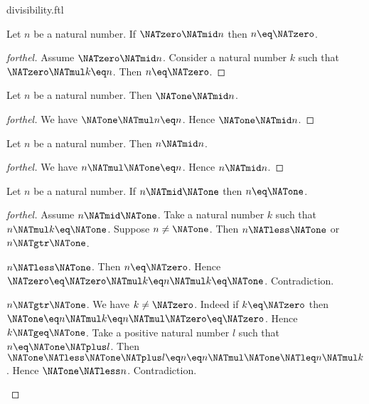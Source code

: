 \documentclass{stex}
\begin{document}
\begin{smodule}{divisibility.ftl}
\begin{proposition}[forthel,id=ARITHMETIC_07_8611150130315264]
  Let $n$ be a natural number.
  If $\NATzero \NATmid n$ then $n \eq \NATzero$.
\end{proposition}
\begin{proof}[forthel]
  Assume $\NATzero \NATmid n$.
  Consider a natural number $k$ such that $\NATzero \NATmul k \eq n$.
  Then $n \eq \NATzero$.
\end{proof}

\begin{proposition}[forthel,id=ARITHMETIC_07_1259086070939648]
  Let $n$ be a natural number.
  Then $\NATone \NATmid n$.
\end{proposition}
\begin{proof}[forthel]
  We have $\NATone \NATmul n \eq n$.
  Hence $\NATone \NATmid n$.
\end{proof}

\begin{proposition}[forthel,id=ARITHMETIC_07_3944887330275328]
  Let $n$ be a natural number.
  Then $n \NATmid n$.
\end{proposition}
\begin{proof}[forthel]
  We have $n \NATmul \NATone \eq n$.
  Hence $n \NATmid n$.
\end{proof}

\begin{proposition}[forthel,id=ARITHMETIC_07_6917446193643520]
  Let $n$ be a natural number.
  If $n \NATmid \NATone$ then $n \eq \NATone$.
\end{proposition}
\begin{proof}[forthel]
  Assume $n \NATmid \NATone$.
  Take a natural number $k$ such that $n \NATmul k \eq \NATone$.
  Suppose $n \neq \NATone$.
  Then $n \NATless \NATone$ or $n \NATgtr \NATone$.

  \begin{case}{$n \NATless \NATone$.}
    Then $n \eq \NATzero$.
    Hence $\NATzero
      \eq \NATzero \NATmul k
      \eq n \NATmul k
      \eq \NATone$.
    Contradiction.
  \end{case}

  \begin{case}{$n \NATgtr \NATone$.}
    We have $k \neq \NATzero$.
    Indeed if $k \eq \NATzero$ then
    $\NATone
      \eq n \NATmul k
      \eq n \NATmul \NATzero
      \eq \NATzero$.
    Hence $k \NATgeq \NATone$.
    Take a positive natural number $l$ such that $n \eq \NATone \NATplus l$.
    Then $\NATone
      \NATless \NATone \NATplus l
      \eq n
      \eq n \NATmul \NATone
      \NATleq n \NATmul k$.
    Hence $\NATone \NATless n$.
    Contradiction.
  \end{case}
\end{proof}


\end{smodule}
\end{document}

